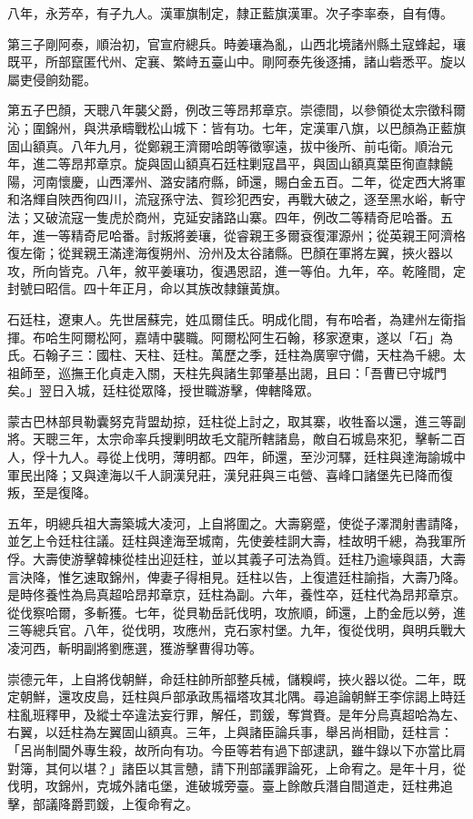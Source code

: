 \begin{pinyinscope}
八年，永芳卒，有子九人。漢軍旗制定，隸正藍旗漢軍。次子李率泰，自有傳。

第三子剛阿泰，順治初，官宣府總兵。時姜瓖為亂，山西北境諸州縣土寇蜂起，瓖既平，所部竄匿代州、定襄、繁峙五臺山中。剛阿泰先後逐捕，諸山砦悉平。旋以屬吏侵餉劾罷。

第五子巴顏，天聰八年襲父爵，例改三等昂邦章京。崇德間，以參領從太宗徵科爾沁；圍錦州，與洪承疇戰松山城下：皆有功。七年，定漢軍八旗，以巴顏為正藍旗固山額真。八年九月，從鄭親王濟爾哈朗等徵寧遠，拔中後所、前屯衛。順治元年，進二等昂邦章京。旋與固山額真石廷柱剿寇昌平，與固山額真葉臣徇直隸饒陽，河南懷慶，山西澤州、潞安諸府縣，師還，賜白金五百。二年，從定西大將軍和洛輝自陜西徇四川，流寇孫守法、賀珍犯西安，再戰大破之，逐至黑水峪，斬守法；又破流寇一隻虎於商州，克延安諸路山寨。四年，例改二等精奇尼哈番。五年，進一等精奇尼哈番。討叛將姜瓖，從睿親王多爾袞復渾源州；從英親王阿濟格復左衛；從巽親王滿達海復朔州、汾州及太谷諸縣。巴顏在軍將左翼，挾火器以攻，所向皆克。八年，敘平姜瓖功，復遇恩詔，進一等伯。九年，卒。乾隆間，定封號曰昭信。四十年正月，命以其族改隸鑲黃旗。

石廷柱，遼東人。先世居蘇完，姓瓜爾佳氏。明成化間，有布哈者，為建州左衛指揮。布哈生阿爾松阿，嘉靖中襲職。阿爾松阿生石翰，移家遼東，遂以「石」為氏。石翰子三：國柱、天柱、廷柱。萬歷之季，廷柱為廣寧守備，天柱為千總。太祖師至，巡撫王化貞走入關，天柱先與諸生郭肇基出謁，且曰：「吾曹已守城門矣。」翌日入城，廷柱從眾降，授世職游擊，俾轄降眾。

蒙古巴林部貝勒囊努克背盟劫掠，廷柱從上討之，取其寨，收牲畜以還，進三等副將。天聰三年，太宗命率兵搜剿明故毛文龍所轄諸島，敵自石城島來犯，擊斬二百人，俘十九人。尋從上伐明，薄明都。四年，師還，至沙河驛，廷柱與達海諭城中軍民出降；又與達海以千人詗漢兒莊，漢兒莊與三屯營、喜峰口諸堡先已降而復叛，至是復降。

五年，明總兵祖大壽築城大凌河，上自將圍之。大壽窮蹙，使從子澤潤射書請降，並乞上令廷柱往議。廷柱與達海至城南，先使姜桂詗大壽，桂故明千總，為我軍所俘。大壽使游擊韓棟從桂出迎廷柱，並以其義子可法為質。廷柱乃逾壕與語，大壽言決降，惟乞速取錦州，俾妻子得相見。廷柱以告，上復遣廷柱諭指，大壽乃降。是時佟養性為烏真超哈昂邦章京，廷柱為副。六年，養性卒，廷柱代為昂邦章京。從伐察哈爾，多斬獲。七年，從貝勒岳託伐明，攻旅順，師還，上酌金卮以勞，進三等總兵官。八年，從伐明，攻應州，克石家村堡。九年，復從伐明，與明兵戰大凌河西，斬明副將劉應選，獲游擊曹得功等。

崇德元年，上自將伐朝鮮，命廷柱帥所部整兵械，儲糗崿，挾火器以從。二年，既定朝鮮，還攻皮島，廷柱與戶部承政馬福塔攻其北隅。尋追論朝鮮王李倧謁上時廷柱亂班釋甲，及縱士卒違法妄行罪，解任，罰鍰，奪賞賚。是年分烏真超哈為左、右翼，以廷柱為左翼固山額真。三年，上與諸臣論兵事，舉呂尚相勖，廷柱言：「呂尚制閫外專生殺，故所向有功。今臣等若有過下部逮訊，雖牛錄以下亦當比肩對簿，其何以堪？」諸臣以其言戇，請下刑部議罪論死，上命宥之。是年十月，從伐明，攻錦州，克城外諸屯堡，進破城旁臺。臺上餘敵兵潛自間道走，廷柱弗追擊，部議降爵罰鍰，上復命宥之。


\end{pinyinscope}
